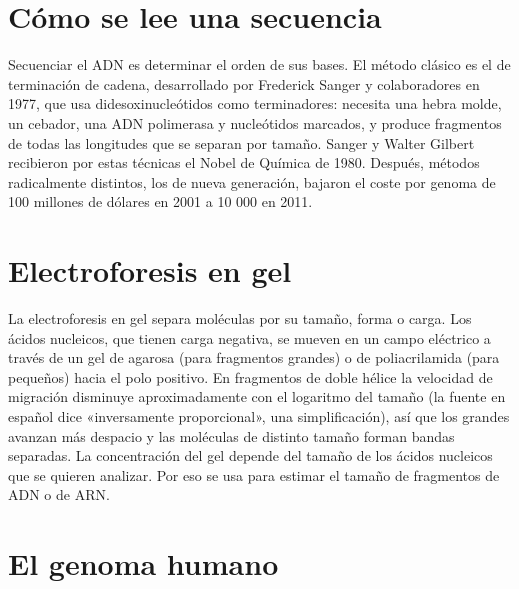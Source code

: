 \documentclass{book}
\begin{document}

\section{Cómo se lee una secuencia}

Secuenciar el ADN es determinar el orden de sus bases. El método clásico es el de terminación de cadena, desarrollado por Frederick Sanger y colaboradores en 1977, que usa didesoxinucleótidos como terminadores: necesita una hebra molde, un cebador, una ADN polimerasa y nucleótidos marcados, y produce fragmentos de todas las longitudes que se separan por tamaño. Sanger y Walter Gilbert recibieron por estas técnicas el Nobel de Química de 1980. Después, métodos radicalmente distintos, los de nueva generación, bajaron el coste por genoma de 100 millones de dólares en 2001 a 10 000 en 2011.


\section{Electroforesis en gel}

La electroforesis en gel separa moléculas por su tamaño, forma o carga. Los ácidos nucleicos, que tienen carga negativa, se mueven en un campo eléctrico a través de un gel de agarosa (para fragmentos grandes) o de poliacrilamida (para pequeños) hacia el polo positivo. En fragmentos de doble hélice la velocidad de migración disminuye aproximadamente con el logaritmo del tamaño (la fuente en español dice «inversamente proporcional», una simplificación), así que los grandes avanzan más despacio y las moléculas de distinto tamaño forman bandas separadas. La concentración del gel depende del tamaño de los ácidos nucleicos que se quieren analizar. Por eso se usa para estimar el tamaño de fragmentos de ADN o de ARN.


\section{El genoma humano}
\end{document}
